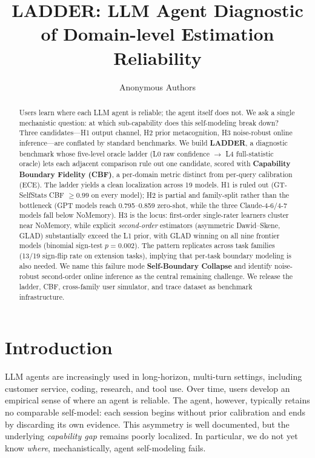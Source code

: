 \documentclass[11pt]{article}
\title{LADDER: LLM Agent Diagnostic of Domain-level Estimation Reliability}
\author{
  Anonymous Authors
}
\begin{document}
\maketitle

\begin{abstract}
Users learn where each LLM agent is reliable; the agent itself does not. We ask a single mechanistic question: at which sub-capability does this self-modeling break down? Three candidates---H1 output channel, H2 prior metacognition, H3 noise-robust online inference---are conflated by standard benchmarks. We build \textbf{LADDER}, a diagnostic benchmark whose five-level oracle ladder (L0 raw confidence $\to$ L4 full-statistic oracle) lets each adjacent comparison rule out one candidate, scored with \textbf{Capability Boundary Fidelity (CBF)}, a per-domain metric distinct from per-query calibration (ECE). The ladder yields a clean localization across 19 models. H1 is ruled out (GT-SelfStats CBF $\geq 0.99$ on every model); H2 is partial and family-split rather than the bottleneck (GPT models reach 0.795--0.859 zero-shot, while the three Claude-4-6/4-7 models fall below NoMemory). H3 is the locus: first-order single-rater learners cluster near NoMemory, while explicit \emph{second-order} estimators (asymmetric Dawid--Skene, GLAD) substantially exceed the L1 prior, with GLAD winning on all nine frontier models (binomial sign-test $p=0.002$). The pattern replicates across task families (13/19 sign-flip rate on extension tasks), implying that per-task boundary modeling is also needed. We name this failure mode \textbf{Self-Boundary Collapse} and identify noise-robust second-order online inference as the central remaining challenge. We release the ladder, CBF, cross-family user simulator, and trace dataset as benchmark infrastructure.
\end{abstract}

\section{Introduction}
\label{sec:intro}



LLM agents are increasingly used in long-horizon, multi-turn settings, including customer service, coding, research, and tool use. Over time, users develop an empirical sense of where an agent is reliable. The agent, however, typically retains no comparable self-model: each session begins without prior calibration and ends by discarding its own evidence. This asymmetry is well documented, but the underlying \emph{capability gap} remains poorly localized. In particular, we do not yet know \emph{where}, mechanistically, agent self-modeling fails.
\end{document}

